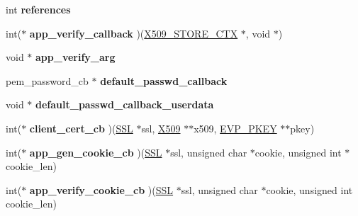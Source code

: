 \begin{DoxyCompactItemize}
\begin{tabbing}
\end{tabbing}\item 
\mbox{\label{structssl__ctx__st_aaefa58bdf5771d0ae34e05dbc372f6c3}} 
int {\bfseries references}
\item 
\mbox{\label{structssl__ctx__st_a15acd6b0d3d6e8307c6c67e7d46c9e96}} 
int($\ast$ {\bfseries app\+\_\+verify\+\_\+callback} )(\hyperlink{structx509__store__ctx__st}{X509\+\_\+\+S\+T\+O\+R\+E\+\_\+\+C\+TX} $\ast$, void $\ast$)
\item 
\mbox{\label{structssl__ctx__st_ac65736129c311f93009b7f3d67b95bcf}} 
void $\ast$ {\bfseries app\+\_\+verify\+\_\+arg}
\item 
\mbox{\label{structssl__ctx__st_a8065ec3c28e4a61ff8041119cc029aa2}} 
pem\+\_\+password\+\_\+cb $\ast$ {\bfseries default\+\_\+passwd\+\_\+callback}
\item 
\mbox{\label{structssl__ctx__st_a66ba3cb88f01250883fd336791b354b2}} 
void $\ast$ {\bfseries default\+\_\+passwd\+\_\+callback\+\_\+userdata}
\item 
\mbox{\label{structssl__ctx__st_a8e17061307de6d07b35e2563ef8ce550}} 
int($\ast$ {\bfseries client\+\_\+cert\+\_\+cb} )(\hyperlink{structssl__st}{S\+SL} $\ast$ssl, \hyperlink{structx509__st}{X509} $\ast$$\ast$x509, \hyperlink{structevp__pkey__st}{E\+V\+P\+\_\+\+P\+K\+EY} $\ast$$\ast$pkey)
\item 
\mbox{\label{structssl__ctx__st_ab2351134c9d3a5f42c85d731edfa4c1b}} 
int($\ast$ {\bfseries app\+\_\+gen\+\_\+cookie\+\_\+cb} )(\hyperlink{structssl__st}{S\+SL} $\ast$ssl, unsigned char $\ast$cookie, unsigned int $\ast$cookie\+\_\+len)
\item 
\mbox{\label{structssl__ctx__st_ae4800a3da47080713f12d4d1ca51be16}} 
int($\ast$ {\bfseries app\+\_\+verify\+\_\+cookie\+\_\+cb} )(\hyperlink{structssl__st}{S\+SL} $\ast$ssl, unsigned char $\ast$cookie, unsigned int cookie\+\_\+len)
\item 
\mbox{\label{structssl__ctx__st_a5deb70881c01f2e35ea2fa46c37ba21e}} 

\end{DoxyCompactItemize}
